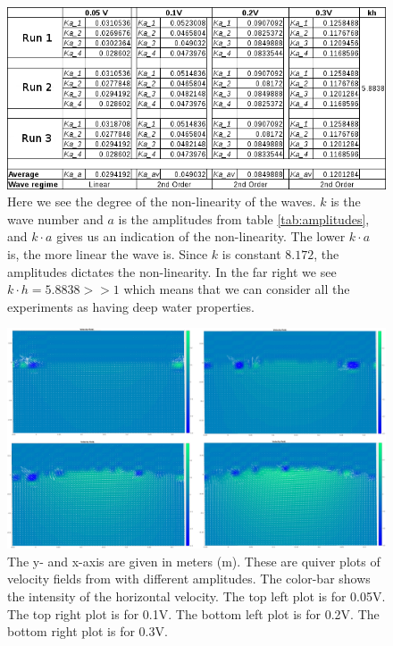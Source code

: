 \documentclass[english,a4paper,12pt]{article}
\begin{document}
\begin{figure}[H]
    \centering
    \includegraphics[width=160mm]{snapshot1.png}
    \caption{Here we see the degree of the non-linearity of the waves. $k$ is the wave number and $a$ is the amplitudes from table \ref{tab:amplitudes}, and $k\cdot a$ gives us an indication of the non-linearity. The lower $k\cdot a$ is, the more linear the wave is. Since $k$ is constant $8.172$, the amplitudes dictates the non-linearity.
    In the far right we see  $k\cdot h = 5.8838 >> 1$ which means that we can consider all the experiments as having deep water properties.}
    \label{fig:2}
\end{figure}


\begin{figure}[H]
    \centering
    \includegraphics[width=160mm]{Velocity_Field_all_in_one.png}
    \caption{The y- and x-axis are given in meters (m). These are quiver plots of velocity fields from with different amplitudes. The color-bar shows the intensity of the horizontal velocity.
    The top left plot is for 0.05V. The top right plot is for 0.1V. The bottom left plot is for 0.2V. The bottom right plot is for 0.3V.}
    \label{fig:3}
\end{figure}
\end{document}
